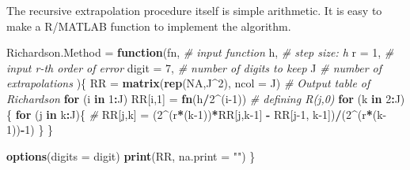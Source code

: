 \documentclass[
]{book}
\newenvironment{Shaded}{\begin{snugshade}}{\end{snugshade}}
\newcommand{\AttributeTok}[1]{\textcolor[rgb]{0.13,0.29,0.53}{#1}}
\newcommand{\CommentTok}[1]{\textcolor[rgb]{0.56,0.35,0.01}{\textit{#1}}}
\newcommand{\ConstantTok}[1]{\textcolor[rgb]{0.56,0.35,0.01}{#1}}
\newcommand{\ControlFlowTok}[1]{\textcolor[rgb]{0.13,0.29,0.53}{\textbf{#1}}}
\newcommand{\DecValTok}[1]{\textcolor[rgb]{0.00,0.00,0.81}{#1}}
\newcommand{\FunctionTok}[1]{\textcolor[rgb]{0.13,0.29,0.53}{\textbf{#1}}}
\newcommand{\NormalTok}[1]{#1}
\newcommand{\OtherTok}[1]{\textcolor[rgb]{0.56,0.35,0.01}{#1}}
\newcommand{\SpecialCharTok}[1]{\textcolor[rgb]{0.81,0.36,0.00}{\textbf{#1}}}
\newcommand{\StringTok}[1]{\textcolor[rgb]{0.31,0.60,0.02}{#1}}
\begin{document}
The recursive extrapolation procedure itself is simple arithmetic. It is easy to make a R/MATLAB function to implement the algorithm.

\begin{Shaded}
\begin{Highlighting}[]
\NormalTok{Richardson.Method }\OtherTok{=} \ControlFlowTok{function}\NormalTok{(fn,          }\CommentTok{\# input function}
\NormalTok{                             h,           }\CommentTok{\# step size: h}
                             \AttributeTok{r =} \DecValTok{1}\NormalTok{,       }\CommentTok{\# input r{-}th order of error}
                             \AttributeTok{digit =} \DecValTok{7}\NormalTok{,   }\CommentTok{\# number of digits to keep}
\NormalTok{                             J            }\CommentTok{\# number of extrapolations}
\NormalTok{                            )\{}
\NormalTok{  RR }\OtherTok{=} \FunctionTok{matrix}\NormalTok{(}\FunctionTok{rep}\NormalTok{(}\ConstantTok{NA}\NormalTok{,J}\SpecialCharTok{\^{}}\DecValTok{2}\NormalTok{), }\AttributeTok{ncol =}\NormalTok{ J)     }\CommentTok{\# Output table of Richardson}
  \ControlFlowTok{for}\NormalTok{ (i }\ControlFlowTok{in} \DecValTok{1}\SpecialCharTok{:}\NormalTok{J) RR[i,}\DecValTok{1}\NormalTok{] }\OtherTok{=} \FunctionTok{fn}\NormalTok{(h}\SpecialCharTok{/}\DecValTok{2}\SpecialCharTok{\^{}}\NormalTok{(i}\DecValTok{{-}1}\NormalTok{)) }\CommentTok{\# defining R(j,0)}
  \ControlFlowTok{for}\NormalTok{ (k }\ControlFlowTok{in} \DecValTok{2}\SpecialCharTok{:}\NormalTok{J)\{}
      \ControlFlowTok{for}\NormalTok{ (j }\ControlFlowTok{in}\NormalTok{ k}\SpecialCharTok{:}\NormalTok{J)\{                    }\CommentTok{\#}
\NormalTok{          RR[j,k] }\OtherTok{=}\NormalTok{ (}\DecValTok{2}\SpecialCharTok{\^{}}\NormalTok{(r}\SpecialCharTok{*}\NormalTok{(k}\DecValTok{{-}1}\NormalTok{))}\SpecialCharTok{*}\NormalTok{RR[j,k}\DecValTok{{-}1}\NormalTok{] }\SpecialCharTok{{-}}\NormalTok{ RR[j}\DecValTok{{-}1}\NormalTok{, k}\DecValTok{{-}1}\NormalTok{])}\SpecialCharTok{/}\NormalTok{(}\DecValTok{2}\SpecialCharTok{\^{}}\NormalTok{(r}\SpecialCharTok{*}\NormalTok{(k}\DecValTok{{-}1}\NormalTok{))}\SpecialCharTok{{-}}\DecValTok{1}\NormalTok{)}
\NormalTok{       \}}
\NormalTok{  \}}
  
  \FunctionTok{options}\NormalTok{(}\AttributeTok{digits =}\NormalTok{ digit)}
  \FunctionTok{print}\NormalTok{(RR, }\AttributeTok{na.print =} \StringTok{""}\NormalTok{)}
\NormalTok{\}}
\end{Highlighting}
\end{Shaded}
\end{document}
